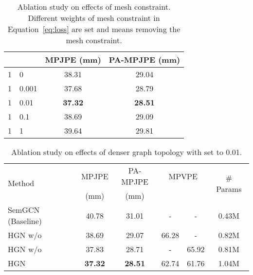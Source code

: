 \documentclass{bmvc2k}
\begin{document}
\begin{table}[!t]
\renewcommand{\baselinestretch}{1.0}
\renewcommand{\arraystretch}{1.0}
\centering
\small
\caption{Ablation study on effects of mesh constraint. Different weights of mesh constraint  in Equation~\eqref{eq:loss} are set and    means removing the mesh constraint.}\label{table:abla-on-loss}\begin{tabular}{l|l|c|c}
\hline
&&MPJPE (mm)&PA-MPJPE (mm)\\ \hline\hline
1 & 0 &38.31 &29.04 \\ \hline
1 & 0.001 &37.68 &28.79\\ \hline
1 & 0.01 &{\bf37.32} &{\bf 28.51} \\ \hline
1 & 0.1 &38.69 &29.09 \\ \hline
1 & 1 & 39.64 &29.81 \\ \hline
\end{tabular}
\end{table}
\begin{table}[!t]
\renewcommand{\baselinestretch}{1.0}
\renewcommand{\arraystretch}{1.0}
\centering
\small
\caption{Ablation study on effects of denser graph topology with  set to 0.01.}  \begin{tabular}{l|cc|cc|c}
\hline

\multirow{2}{*}{Method} & MPJPE& PA-MPJPE& \multicolumn{2}{c|}{MPVPE}& \multirow{2}{*}{\# Params}\\
\cline{4-5}
&(mm)&(mm)&& \\
\hline
\hline
SemGCN (Baseline)~\cite{zhao2019semantic} &40.78&31.01 &-&-&0.43M  \\ \hline
HGN w/o  & 38.69&29.07 &66.28&-&0.82M  \\ \hline
HGN w/o  &37.83 &28.71&-&65.92&0.81M \\ \hline
HGN  &{\bf37.32} &{\bf 28.51}    &62.74&61.76&1.04M \\ \hline
\end{tabular}
\label{table:abla-on-network-structure}
\vspace{-15pt}
\end{table}
\end{document}
